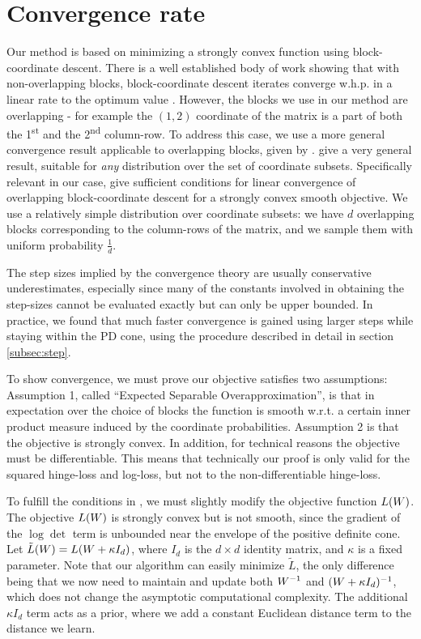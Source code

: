 \documentclass{article}
\begin{document}
\section{Convergence rate}
Our method is based on minimizing a strongly convex function using block-coordinate descent. There is a well established body of work showing that with non-overlapping blocks, block-coordinate descent iterates converge w.h.p. in a linear rate to the optimum value \cite{nesterov2012efficiency,richtarik2014iteration}.
However, the blocks we use in our method are overlapping - for example the $(1,2)$ coordinate of the matrix is a part of both the 1\textsuperscript{st} and the 2\textsuperscript{nd} column-row. To address this case, we use a more general convergence result applicable to overlapping blocks, given by \citet{richtarik2013optimal}. \citeauthor{richtarik2013optimal} give a very general result, suitable for \emph{any} distribution over the set of coordinate subsets. 
Specifically relevant in our case, \citeauthor{richtarik2013optimal} give sufficient conditions for linear convergence of overlapping block-coordinate descent for a strongly convex smooth objective. We use a relatively simple distribution over coordinate subsets: we have $d$ overlapping blocks corresponding to the column-rows of the matrix, and we sample them with uniform probability $\frac{1}{d}$.


The step sizes implied by the convergence theory are usually conservative underestimates, especially since many of the constants involved in obtaining the step-sizes cannot be evaluated exactly but can only be upper bounded. In practice, we found that much faster convergence is gained using larger steps while staying within the PD cone, using the procedure described in detail in section \ref{subsec:step}.

To show convergence, we must prove our objective satisfies two assumptions: Assumption 1, called ``Expected Separable Overapproximation'', is that in expectation over the choice of blocks the function is smooth w.r.t. a certain inner product measure induced by the coordinate probabilities. Assumption 2 is that the objective is strongly convex. In addition, for technical reasons the objective must be differentiable. This means that technically our proof is only valid for the squared hinge-loss and log-loss, but not to the non-differentiable hinge-loss.

To fulfill the conditions in \cite{richtarik2013optimal}, we must slightly modify the objective function $L({{W}})$. The objective $L({W})$ is strongly convex but is not smooth, since the gradient of the $\log \det$ term is unbounded near the envelope of the positive definite cone. Let $\tilde{L}({{W}}) = L({{W} + \kappa I_d})$, where $I_d$ is the $d \times d$ identity matrix, and $\kappa$ is a fixed parameter.
Note that our algorithm can easily minimize $\tilde{L}$, the only difference being that we now need to maintain and update both ${W}^{-1}$ and $({W}+\kappa I_d)^{-1}$, which does not change the asymptotic computational complexity. The additional $\kappa I_d$ term acts as a prior, where we add a constant Euclidean distance term to the distance we learn. 
\end{document}
